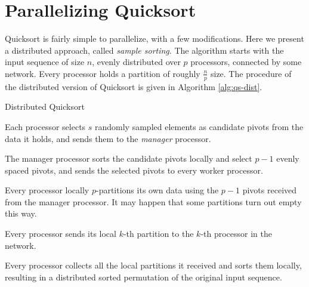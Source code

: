 \documentclass[]{finalproject}
\begin{document}
\section{Parallelizing Quicksort}

Quicksort is fairly simple to parallelize, with a few modifications. Here we present a distributed approach, called \textit{sample sorting}.
The algorithm starts with the input sequence of size $n$, evenly distributed over $p$ processors, connected by some network.
Every processor holds a partition of roughly $\frac{n}{p}$ size.
The procedure of the distributed version of Quicksort is given in Algorithm \ref{alg:qs-dist}.

\begin{algorithm}
  \caption{Distributed Quicksort}
  \label{alg:qs-dist}
  Each processor selects $s$ randomly sampled elements as candidate pivots from the data it holds, and sends them to the \textit{manager} processor.

  The manager processor sorts the candidate pivots locally and select $p-1$ evenly spaced pivots, and sends the selected pivots to every worker processor.

  Every processor locally $p$-partitions its own data using the $p-1$ pivots received from the manager processor.
  It may happen that some partitions turn out empty this way.

  Every processor sends its local $k$-th partition to the $k$-th processor in the network.

  Every processor collects all the local partitions it received and sorts them locally,
  resulting in a distributed sorted permutation of the original input sequence.
\end{algorithm}
\end{document}
